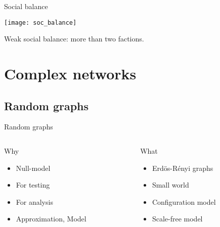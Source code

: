 \documentclass[hide notes,compress]{beamer}
\begin{document}
\begin{frame}[t]{Social balance} 

  \texttt{[image: soc\_balance]}

  Weak social balance: more than two factions.
\end{frame}


\section{Complex networks}

\subsection{Random graphs}

\begin{frame}[c]{Random graphs}

  \begin{columns}[t]

    \begin{column}{.5\textwidth}
      \begin{block}{Why}
        \begin{itemize}
          \item Null-model
          \item For testing
          \item For analysis
          \item Approximation, Model
        \end{itemize}  
      \end{block}
    \end{column}

    \begin{column}{.5\textwidth}
      \begin{block}{What}
        \begin{itemize}
          \item Erdös-Rényi graphs
          \item Small world
          \item Configuration model
          \item Scale-free model
        \end{itemize}  
      \end{block}
    \end{column}
  \end{columns}
  
\end{frame}
\end{document}
